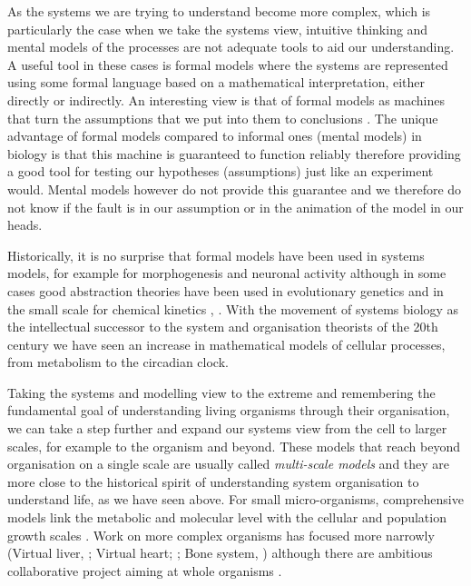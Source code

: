 As the systems we are trying to understand become more complex, which is
particularly the case when we take the systems view, intuitive thinking and
mental models of the processes are not adequate tools to aid our
understanding. A useful tool in these cases is formal models where the systems
are represented using some formal language based on a mathematical
interpretation, either directly or indirectly. An interesting view is that of
formal models as machines that turn the assumptions that we put into them to
conclusions \citep{gunawardena_models_2014}. The unique advantage of formal
models compared to informal ones (mental models) in biology is that this machine
is guaranteed to function reliably therefore providing a good tool for testing our
hypotheses (assumptions) just like an experiment would. Mental models however do
not provide this guarantee and we therefore do not know if the fault is in our
assumption or in the animation of the model in our heads.

Historically, it is no surprise that formal models have been used in systems
models, for example for morphogenesis \citep{turing_chemical_1952} and neuronal
activity \citep{hodgkin_quantitative_1952} although in some cases good
abstraction theories have been used in evolutionary genetics \citep[by
abstracting away the organism;][]{dobzhansky1982genetics} and in the small scale
for chemical kinetics \citep{michaelis1913kinetics, gunawardena_lessons_2012},
\citep[see also;][]{gunawardena2013biology}. With the movement of systems
biology as the intellectual successor to the system and organisation theorists
of the 20th century we have seen an increase in mathematical models of cellular
processes, from metabolism to the circadian clock.

Taking the systems and modelling view to the extreme and remembering the
fundamental goal of understanding living organisms through their organisation,
we can take a step further and expand our systems view from the cell to larger
scales, for example to the organism and beyond. These models that reach beyond
organisation on a single scale are usually called \emph{multi-scale models} and
they are more close to the historical spirit of understanding system
organisation to understand life, as we have seen above. For small
micro-organisms, comprehensive models link the metabolic and molecular level
with the cellular \citep{karr_whole-cell_2012} and population growth scales
\citep{weise_mechanistic_2015}. Work on more complex organisms has focused more
narrowly (Virtual liver, \citet{holzhutter2012virtual}; Virtual heart;
\citet{noble_modeling_2002}; Bone system, \citet{paoletti_multilevel_2012})
although there are ambitious collaborative project aiming at whole organisms
\citep[virtual rat, virtual human][]{beard_multiscale_2012, kohl_systems_2009}.

